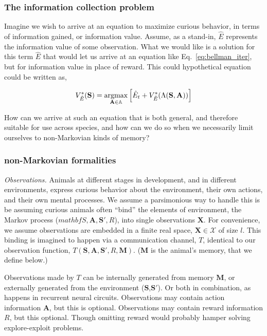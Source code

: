 \subsubsection*{The information collection problem}
Imagine we wish to arrive at an equation to maximize curious behavior, in terms of information gained, or information value. Assume, as a stand-in, $\hat E$ represents the information value of some observation. What we would like is a solution for this term $\hat E$ that would let us arrive at an equation like Eq.~\ref{eq:bellman_iter}, but for information value in place of reward. This could hypothetical equation could be written as, 

\begin{equation} 
	\label{eq:bellman_iter_E}
	V^*_{\hat E}(\mathbf{S}) = \operatorname*{argmax}_{\mathbf{A} \in \mathbb{A}} \Big [ \hat E_{t}  + V^*_{\hat E}(\Lambda(\mathbf{S},\mathbf{A})) \Big ]
\end{equation}

How can we arrive at such an equation that is both general, and therefore suitable for use across species, and how can we do so when we necessarily limit ourselves to non-Markovian kinds of memory? 

\subsubsection*{non-Markovian formalities}
\emph{Observations.} Animals at different stages in development, and in different environments, express curious behavior about the environment, their own actions, and their own mental processes. We assume a parsimonious way to handle this is be assuming curious animals often ``bind'' \cite{Robertson2003} the elements of environment, the Markov process ($mathbf{S},\mathbf{A},\mathbf{S'},R$), into single observations $\mathbf{X}$. For convenience, we assume observations are embedded in a finite real space, $\mathbf{X} \in \mathcal{X}$ of size $l$. This binding is imagined to happen via a communication channel, $T$, identical to our observation function, $T(\mathbf{S},\mathbf{A},\mathbf{S'},R,\mathbf{M})$. ($\mathbf{M}$ is the animal's memory, that we define below.)

Observations made by $T$ can be internally generated from memory $\mathbf{M}$, or externally generated from the environment ($\mathbf{S}$,$\mathbf{S'}$). Or both in combination, as happens in recurrent neural circuits. Observations may contain action information $\mathbf{A}$, but this is optional. Observations may contain reward information $R$, but this optional. Though omitting reward would probably hamper solving explore-exploit problems. 

